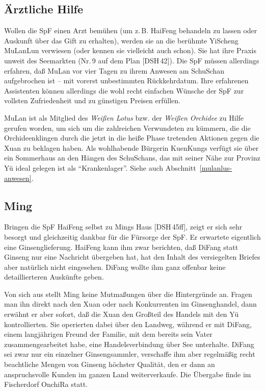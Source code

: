 \documentclass[
a4paper,
twoside,
DIV=calc,
BCOR=4mm,
fontsize=9pt,
twocolumn=on,
titlepage=on,
parskip=half
]{scrartcl}
\begin{document}
\subsection{Ärztliche Hilfe}

Wollen die SpF einen Arzt bemühen (um z.\,B. HaiFeng behandeln zu
lassen oder Auskunft über das Gift zu erhalten), werden sie an die
berühmte YiScheng MuLanLun verwiesen (oder kennen sie vielleicht auch
schon). Sie hat ihre Praxis unweit des Seemarkten (Nr.\,9 auf dem Plan
[DSH\,42]). Die SpF müssen allerdings erfahren, daß MuLan vor vier
Tagen zu ihrem Anwesen am SchuSchan aufgebrochen ist -- mit vorerst
unbestimmten Rückkehrdatum. Ihre erfahrenen Assistenten können
allerdings die wohl recht einfachen Wünsche der SpF zur vollsten
Zufriedenheit und zu günstigen Preisen erfüllen.

MuLan ist als Mitglied des \emph{Weißen Lotus} bzw. der \emph{Weißen
  Orchidee} zu Hilfe gerufen worden, um sich um die zahlreichen
Verwundeten zu kümmern, die die Orchideenklingen durch die jetzt in
die heiße Phase tretenden Aktionen gegen die Xuan zu beklagen
haben. Als wohlhabende Bürgerin KuenKungs verfügt sie über ein
Sommerhaus an den Hängen des SchuSchans, das mit seiner Nähe zur
Provinz Yü ideal gelegen ist als "`Krankenlager"'. Siehe auch
Abschnitt~\ref{mulanlus-anwesen}.

\subsection{Ming}

Bringen die SpF HaiFeng selbst zu Mings Haus [DSH\,45ff], zeigt er
sich sehr besorgt und gleichzeitig dankbar für die Fürsorge der
SpF. Er erwartete eigentlich eine Ginsenglieferung. HaiFeng kann ihm
zwar berichten, daß DiFang statt Ginseng nur eine Nachricht übergeben
hat, hat den Inhalt des versiegelten Briefes aber natürlich nicht
eingesehen. DiFang wollte ihm ganz offenbar keine detaillierteren
Auskünfte geben.

Von sich aus stellt Ming keine Mutmaßungen über die Hintergründe
an. Fragen man ihn direkt nach den Xuan oder nach Konkurrenten im
Ginsenghandel, dann erwähnt er aber sofort, daß die Xuan den Großteil
des Handels mit den Yü kontrollierten. Sie operierten dabei über den
Landweg, während er mit DiFang, einem langjährigen Freund der Familie,
mit dem bereits sein Vater zusammengearbeitet habe, eine
Handelsverbindung über See unterhalte. DiFang sei zwar nur ein
einzelner Ginsengsammler, verschaffe ihm aber regelmäßig recht
beachtliche Mengen von Ginseng höchster Qualität, den er dann an
anspruchsvolle Kunden im ganzen Land weiterverkaufe. Die Übergabe
finde im Fischerdorf OnchiRa statt.
\end{document}
